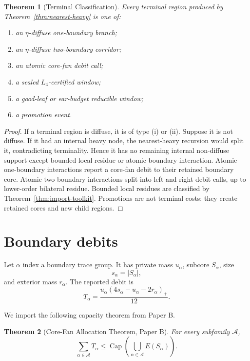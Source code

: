 \documentclass[11pt]{article}
\newtheorem{theorem}{Theorem}[section]
\theoremstyle{definition}
\newcommand{\CoreCap}{\operatorname{Cap}}
\newcommand{\calA}{\mathcal A}
\begin{document}
\begin{theorem}[Terminal Classification]\label{thm:terminal-classification}
Every terminal region produced by Theorem~\ref{thm:nearest-heavy} is one of:
\begin{enumerate}[label=(\roman*)]
    \item an \(\eta\)-diffuse one-boundary branch;
    \item an \(\eta\)-diffuse two-boundary corridor;
    \item an atomic core-fan debit call;
    \item a sealed \(L_4\)-certified window;
    \item a good-leaf or ear-budget reducible window;
    \item a promotion event.
\end{enumerate}
\end{theorem}

\begin{proof}
If a terminal region is diffuse, it is of type (i) or (ii). Suppose it is not diffuse. If it had an internal heavy node, the nearest-heavy recursion would split it, contradicting terminality. Hence it has no remaining internal non-diffuse support except bounded local residue or atomic boundary interaction. Atomic one-boundary interactions report a core-fan debit to their retained boundary core. Atomic two-boundary interactions split into left and right debit calls, up to lower-order bilateral residue. Bounded local residues are classified by Theorem~\ref{thm:import-toolkit}. Promotions are not terminal costs: they create retained cores and new child regions.
\end{proof}

\section{Boundary debits}

Let \(\alpha\) index a boundary trace group. It has private mass \(u_\alpha\), subcore \(S_\alpha\), size
\[
    s_\alpha=|S_\alpha|,
\]
and exterior mass \(r_\alpha\). The reported debit is
\[
    T_\alpha
    =
    \frac{
    u_\alpha(4s_\alpha-u_\alpha-2r_\alpha)_+
    }{12}.
\]

We import the following capacity theorem from Paper B.

\begin{theorem}[Core-Fan Allocation Theorem, Paper B]\label{thm:import-core-fan}
For every subfamily \(\calA\),
\[
    \sum_{\alpha\in\calA}T_\alpha
    \le
    \CoreCap\left(
    \bigcup_{\alpha\in\calA}E(S_\alpha)
    \right).
\]
\end{theorem}
\end{document}
